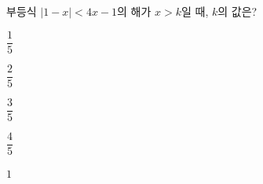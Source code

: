 부등식 $|1-x|<4x-1$의 해가 $x>k$일 때, $k$의 값은?
\begin{choices32}{\rule[-3ex]{0pt}{8ex}$\dfrac{1}{5}$}{\rule[-3ex]{0pt}{8ex}$\dfrac{2}{5}$}{\rule[-3ex]{0pt}{8ex}$\dfrac{3}{5}$}{\rule[-3ex]{0pt}{8ex}$\dfrac{4}{5}$}{\rule[-3ex]{0pt}{8ex}$1$}\end{choices32}
